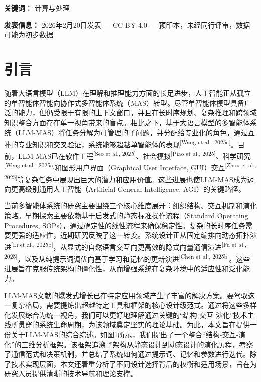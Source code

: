 \documentclass[UTF8,a4paper,12pt]{article}
\begin{document}
\textbf{关键词：} 计算与处理

\textbf{发表信息：} 2026年2月20日发表 --- CC-BY 4.0 --- 预印本，未经同行评审，数据可能为初步数据

\newpage

\section{引言}

随着大语言模型（LLM）在理解和推理能力方面的长足进步，人工智能正从孤立的单智能体智能向协作式多智能体系统（MAS）转型。尽管单智能体模型具备广泛的能力，但仍受限于有限的上下文窗口，并且在长时序规划、复杂推理和跨领域知识整合方面存在单一视角带来的盲点。相比之下，基于大语言模型的多智能体系统（LLM-MAS）将任务分解为可管理的子问题，并分配给专业化的角色，通过互补的专业知识和交叉验证，系统能够超越单智能体的表现\textsuperscript{[Wang et al., 2025a]}。目前，LLM-MAS已在软件工程\textsuperscript{[Seo et al., 2025]}、社会模拟\textsuperscript{[Piao et al., 2025]}、科学研究\textsuperscript{[Weng et al., 2025a]}和图形用户界面（Graphical User Interface, GUI）交互\textsuperscript{[Zhou et al., 2025]}等复杂任务中展现出巨大的潜力和应用价值。这些进展也使LLM-MAS成为迈向更高级别通用人工智能（Artificial General Intelligence, AGI）的关键路径。

当前多智能体系统的研究主要围绕三个核心维度展开：组织结构、交互机制和演化策略。早期探索主要依赖基于启发式的静态标准操作流程（Standard Operating Procedures, SOPs），通过确定性的线性流程来确保稳定性。复杂的长时序任务需要更强的适应性，近期研究反映了这一转变。系统设计正从固定编排向动态拓扑演进\textsuperscript{[Li et al., 2025b]}，从显式的自然语言交互向更高效的隐式向量通信演进\textsuperscript{[Fu et al., 2025]}，以及从纯提示词调优向基于学习和记忆的更新演进\textsuperscript{[Chen et al., 2025b]}。这些进展旨在克服传统架构的僵化性，从而增强系统在复杂环境中的适应性和泛化能力。

LLM-MAS文献的爆发式增长已在特定应用领域产生了丰富的解决方案。要驾驭这一复杂格局，需要提炼出超越特定工具和框架的核心设计级范式。通过将这些多样化发展综合为统一视角，我们可以更好地理解通过关键的``结构-交互-演化''技术主线所贯穿的系统生命周期，为该领域奠定坚实的理论基础。为此，本文旨在提供一份关于LLM-MAS的综合综述。如图1所示，我们提出了一个整合``结构-交互-演化''的三维分析框架。该框架追溯了架构从静态设计到动态设计的演化历程，考察了通信范式和决策机制，并总结了系统如何通过提示词、记忆和参数进行迭代。除了技术实现层面，本文还着重分析了不同设计选择背后的权衡和适用场景，旨在为研究人员提供清晰的技术导航和理论支撑。
\end{document}

